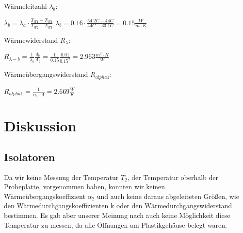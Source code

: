 \documentclass[12pt,a4paper,twopage]{article}
\begin{document}
Wärmeleitzahl $\lambda_b$:

\(\lambda_b = \lambda_a \cdot \frac{T_{W1}-T_{W2}}{T_{W2}-T_{W3}} \)
\(\lambda_b = 0.16 \cdot \frac{54.2C-44C}{44C-33.1C}  = \boxed{ 0.15 \frac{W}{m\cdot K} } \)

Wärmewiderstand $R_\lambda$:

\( R_{\lambda-b} = \frac{1}{\lambda_b}\frac{d_b}{A_b} = \frac{1}{0.15}\frac{0.01}{0.15^2}= \boxed{2.963 \frac{m^2 \cdot K}{W}} \)

Wärmeübergangswiderstand $R_{alpha1}$:

\( R_{alpha1} = \frac{1}{\alpha_1 \cdot A} = \boxed{2.669 \frac{W}{K} }\)

\section{Diskussion}
								
\subsection{Isolatoren}								
Da wir keine Messung der Temperatur $T_2$, der Temperatur oberhalb der Probeplatte, vorgenommen haben, konnten wir keinen Wärmeübergangskoeffizient $\alpha_2$ und auch keine daraus abgeleiteten Größen, wie den Wärmedurchgangskoeffizienten k oder den Wärmedurchgangswiderstand bestimmen. Es gab aber unserer Meinung nach auch keine Möglichkeit diese Temperatur zu messen, da alle Öffnungen am Plastikgehäuse belegt waren.  								
\end{document}
